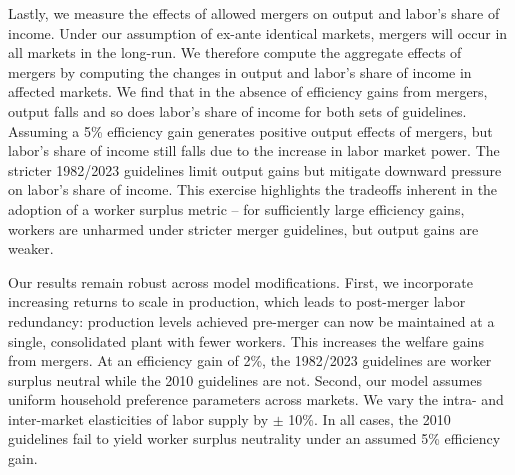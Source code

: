\documentclass[12pt]{article}
\theoremstyle{prop}
\begin{document}
Lastly, we measure the effects of allowed mergers on output and labor's share of income. Under our assumption of ex-ante identical markets, mergers will occur in all markets in the long-run. We therefore compute the aggregate effects of mergers by computing the changes in output and labor's share of income in affected markets. We find that in the absence of efficiency gains from mergers, output falls and so does labor's share of income for both sets of guidelines. Assuming a 5\% efficiency gain generates positive output effects of mergers, but labor's share of income still falls due to the increase in labor market power. The stricter 1982/2023 guidelines limit output gains but mitigate downward pressure on labor's share of income. This exercise highlights the tradeoffs inherent in the adoption of a worker surplus metric -- for sufficiently large efficiency gains, workers are unharmed under stricter merger guidelines, but output gains are weaker.

Our results remain robust across model modifications. 
First, we incorporate increasing returns to scale in production, which leads to post-merger labor redundancy: production levels achieved pre-merger can now be maintained at a single, consolidated plant with fewer workers. 
This increases the welfare gains from mergers. 
At an efficiency gain of 2\%, the 1982/2023 guidelines are worker surplus neutral while the 2010 guidelines are not. 
Second, our model assumes uniform household preference parameters across markets. 
We vary the intra- and inter-market elasticities of labor supply by $\pm$ 10\%. 
In all cases, the 2010 guidelines fail to yield worker surplus neutrality under an assumed 5\% efficiency gain. 
\end{document}
